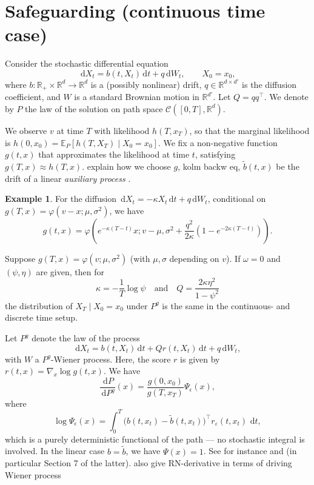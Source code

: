 \documentclass[11pt,reqno]{amsart}
\newcommand{\dd}{{\,\mathrm d}}
\renewcommand{\phi}{\varphi}
\theoremstyle{definition}
\newtheorem{ex}[thm]{Example}
\newcommand{\note}[1]{{\color{Sienna} #1}}
\begin{document}
\newpage
\section{Safeguarding (continuous time case)}



Consider the stochastic differential equation
\begin{equation}\label{eq:SDE}
  \dd X_t = b(t, X_t)\dd t + q \dd W_t, \qquad X_0 = x_0,
\end{equation}
where $b\colon \mathbb{R}_+\times\mathbb{R}^d\to\mathbb{R}^d$ is a (possibly
nonlinear) drift, $q\in\mathbb{R}^{d\times d'}$ is the diffusion coefficient,
and $W$ is a standard Brownian motion in $\mathbb{R}^{d'}$. Let $Q=qq^\top$.
We denote by $P$ the law of the solution on path space
$\mathcal{C}([0,T],\mathbb{R}^d)$.

We observe $v$ at time $T$ with likelihood $h(T, x_T)$, so that the marginal
likelihood is $h(0, x_0) = \mathbb{E}_P[h(T,X_T) \mid X_0=x_0]$. We fix a non-negative function
$g(t,x)$ that approximates the likelihood at time $t$,
satisfying $g(T,x)\approx h(T,x)$. \note{explain how we  choose $g$, kolm backw eq,  $\tilde{b}(t,x)$ be the drift of a linear \emph{auxiliary process} .} 
\begin{ex} For the diffusion $\dd X_t = -\kappa X_t \dd t + q \dd W_t$, conditional on $g(T,x)=\phi(v-x; \mu, \sigma^2)$, we have
\[ g(t,x)= \phi\left(e^{-\kappa(T-t)} x; v-\mu, \sigma^2 +\frac{q^2}{2\kappa} \left(1-e^{-2\kappa(T-t)}\right) \right). \]

Suppose $g(T,x)=\phi(v; \mu, \sigma^2)$ (with $\mu, \sigma$ depending on $v$). If $\omega=0$ and $(\psi, \eta)$ are given, then for
\[ \kappa =-\frac1{T}\log \psi \quad \text{and}\quad  Q=\frac{2\kappa \eta^2}{1-\psi^2} \]
 the distribution of $X_T \mid X_0=x_0$ under $P^g$ is the same in the continuous- and discrete time setup.

\end{ex}


Let $P^g$ denote the law of the process
\[ \dd X_t =b(t,X_t) \dd t + Q r(t,X_t) \dd t + q \dd W_t, \]
with $W$ a $P^g$-Wiener process. Here, the score $r$ is given by  $r(t,x)=\nabla_x \log g(t,x)$. We have
\[ \frac{\dd P}{\dd P^g}(x)= \frac{g(0,x_0)}{g(T,x_T)}
  \Psi_\epsilon(x), \]
  where 
 \begin{equation}\label{eq:log_psi}
  \log\Psi_\epsilon(x) = \int_0^T
    \bigl(b(t,x_t)-\tilde{b}(t,x_t)\bigr)^\top r_\varepsilon(t,x_t)\,\dd t,
\end{equation}
which is a purely deterministic functional of the path --- no stochastic
integral is involved. In the linear case $b=\tilde{b}$, we have $\Psi(x)=1$.
See for instance \cite{schauer2017guided} and   \cite{BFFG} (in particular Section 7 of the latter). \note{also give RN-derivative in terms of driving Wiener process}
\end{document}
